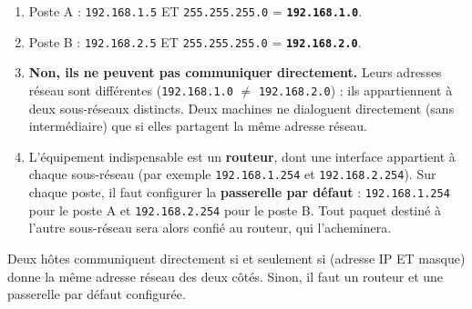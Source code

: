 \documentclass[11pt]{article}
\begin{document}
\begin{corrige}

\begin{enumerate}
    \item Poste A : \texttt{192.168.1.5} ET \texttt{255.255.255.0} = \textbf{\texttt{192.168.1.0}}.
    \item Poste B : \texttt{192.168.2.5} ET \texttt{255.255.255.0} = \textbf{\texttt{192.168.2.0}}.
    \item \textbf{Non, ils ne peuvent pas communiquer directement.} Leurs adresses réseau sont différentes (\texttt{192.168.1.0} $\neq$ \texttt{192.168.2.0}) : ils appartiennent à deux sous-réseaux distincts. Deux machines ne dialoguent directement (sans intermédiaire) que si elles partagent la même adresse réseau.
    \item L'équipement indispensable est un \textbf{routeur}, dont une interface appartient à chaque sous-réseau (par exemple \texttt{192.168.1.254} et \texttt{192.168.2.254}). Sur chaque poste, il faut configurer la \textbf{passerelle par défaut} : \texttt{192.168.1.254} pour le poste A et \texttt{192.168.2.254} pour le poste B. Tout paquet destiné à l'autre sous-réseau sera alors confié au routeur, qui l'acheminera.
\end{enumerate}

\begin{aretenir}
Deux hôtes communiquent directement si et seulement si (adresse IP ET masque) donne la même adresse réseau des deux côtés. Sinon, il faut un routeur et une passerelle par défaut configurée.
\end{aretenir}
\end{corrige}
\end{document}
